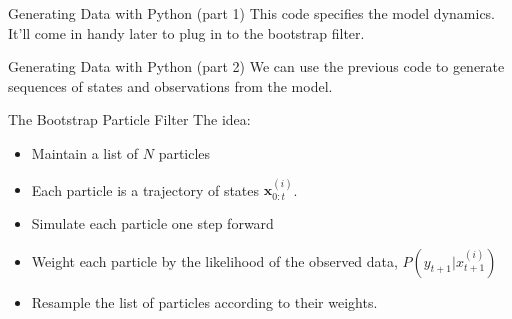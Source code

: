 \documentclass[pdf]
{beamer}
\begin{document}
\begin{frame}[fragile]{Generating Data with Python (part 1)}
  This code specifies the model dynamics. It'll come in handy later to plug in to the bootstrap filter.

  \begin{figure}
  \centering
      \tiny
         
   \end{figure}

\end{frame}

\begin{frame}[fragile]{Generating Data with Python (part 2)}
  We can use the previous code to generate sequences of states and observations from the model.
  
  \begin{figure}
  \centering
      \tiny
         
   \end{figure}
\end{frame}





\begin{frame}{The Bootstrap Particle Filter}
The idea:

\begin{itemize}
  \item Maintain a list of $N$ particles
  \item Each particle is a trajectory of states $\mathbf{x}^{(i)}_{0:t}$.
  \item Simulate each particle one step forward
  \item Weight each particle by the likelihood of the observed data, $P(y_{t+1} | x^{(i)}_{t+1})$
  \item Resample the list of particles according to their weights.
\end{itemize}
\end{frame}
\end{document}
